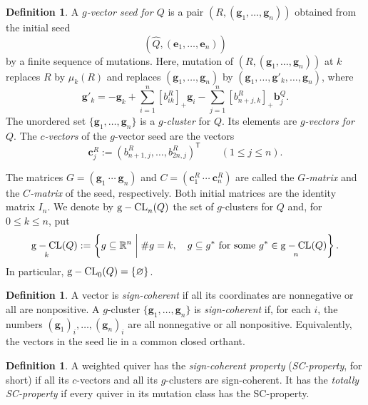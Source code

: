 \documentclass[11pt,reqno]{amsart}
\numberwithin{equation}{section}
\theoremstyle{definition}
\newtheorem{definition}[example]{Definition}
\theoremstyle{plain}
\newcommand{\relmiddle}[1]{\mathrel{}\middle#1\mathrel{}}
\DeclareMathOperator{\gseed}{{\rm g-CL}}
\begin{document}
	\begin{definition}\label{def:gseed}
		A \emph{$g$-vector seed for $Q$} is a pair $(R,(\mathbf g_1,\ldots,\mathbf g_n))$ obtained from the initial seed
		\[
		(\hat Q,(\mathbf e_1,\ldots,\mathbf e_n))
		\]
		by a finite sequence of mutations. Here, mutation of $(R,(\mathbf g_1,\ldots,\mathbf g_n))$ at $k$ replaces $R$ by $\mu_k(R)$ and replaces $(\mathbf g_1,\ldots,\mathbf g_n)$ by $(\mathbf g_1,\ldots, \mathbf{g}'_k, \ldots ,\mathbf g_n)$, where
		\begin{equation}\label{eq:g-final-mutation}
			\mathbf g'_k
      =
      -\mathbf g_k + \sum_{i=1}^n[b_{ik}^R]_+\mathbf g_i - \sum_{j=1}^n[b_{n+j,k}^R]_+\mathbf b_j^Q.
		\end{equation}
		The unordered set $\{\mathbf g_1,\ldots,\mathbf g_n\}$ is a \emph{$g$-cluster} for $Q$. Its elements are \emph{$g$-vectors for $Q$}. The \emph{$c$-vectors} of the $g$-vector seed are the vectors
		\[
		\mathbf c_j^R:=(b_{n+1,j}^R,\ldots,b_{2n,j}^R)^{\mathsf T}
		\qquad(1\leq j\leq n).
		\]
	\end{definition}
	
	The matrices $G=(\mathbf g_1\ \cdots\ \mathbf g_n)$ and $C=(\mathbf c_1^R\ \cdots\ \mathbf c_n^R)$ are called the \emph{$G$-matrix} and the \emph{$C$-matrix} of the seed, respectively. Both initial matrices are the identity matrix $I_n$. We denote by $\gseed_n(Q)$ the set of $g$-clusters for $Q$ and, for $0\leq k\leq n$, put
	\[
	\gseed_k(Q):=
	\left\{g\subseteq\mathbb R^n\relmiddle|
	\#g=k,\quad g\subseteq g^\ast\text{ for some }g^\ast\in\gseed_n(Q)\right\}.
	\]
	In particular, $\gseed_0(Q)=\{\varnothing\}$.
	
	\begin{definition}\label{def:sign-coherence}
		A vector is \emph{sign-coherent} if all its coordinates are nonnegative or all are nonpositive. A $g$-cluster $\{\mathbf g_1,\ldots,\mathbf g_n\}$ is \emph{sign-coherent} if, for each $i$, the numbers $(\mathbf g_1)_i,\ldots,(\mathbf g_n)_i$ are all nonnegative or all nonpositive. Equivalently, the vectors in the seed lie in a common closed orthant.
	\end{definition}
	
	\begin{definition}\label{def:SC}
		A weighted quiver has the \emph{sign-coherent property} (\emph{SC-property}, for short) if all its $c$-vectors and all its $g$-clusters are sign-coherent. It has the \emph{totally SC-property} if every quiver in its mutation class has the SC-property.
	\end{definition}
	
\end{document}
